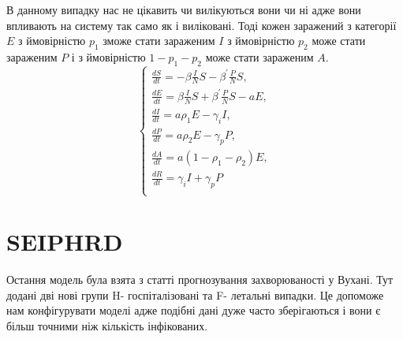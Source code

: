 В данному випадку нас не цікавить чи вилікуються вони
чи ні адже вони впливають на систему так само як і виліковані. Тоді кожен 
заражений з категорії $E$ з ймовірністю $p_1$ зможе стати зараженим $I$ 
з ймовірністю $p_2$ може стати зараженим $P$ і з ймовірністю $1 - p_1 - p_2$
може стати зараженим $A$.\cite{palka_using_2022} 
\begin{equation*}
    \left\{\begin{array}{l}
    \frac{d S}{d t}=-\beta \frac{I}{N} S-\beta^{\prime} \frac{P}{N} S, \\
    \frac{d E}{d t}=\beta \frac{I}{N} S +\beta^{\prime} \frac{P}{N} S- aE, \\
    \frac{d I}{d t}= a \rho_1 E-\gamma_i I, \\
    \frac{d P}{d t}= a \rho_2 E-\gamma_p P, \\
    \frac{d A}{d t}= a\left(1-\rho_1-\rho_2\right) E, \\
    \frac{d R}{d t}=\gamma_i I + \gamma_p P\\
    \end{array}\right.
\end{equation*}

\section{SEIPHRD}


Остання модель була взята з статті прогнозування захворюваності у 
Вухані.\cite{ndairou_mathematical_2020} 
Тут додані дві нові групи 
H- госпіталізовані та F- летальні випадки. Це допоможе нам конфігурувати 
моделі адже подібні дані дуже часто зберігаються і вони є більш точними 
ніж кількість інфікованих. 


